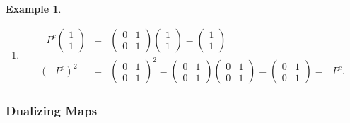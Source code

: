 \documentclass[aps,preprint]{revtex4}
\newtheorem{example}[theorem]{Example}
\begin{document}
\begin{example}
\begin{enumerate}
\begin{enumerate}
\item 
\begin{eqnarray}
\text{ }P^{c}\left( 
\begin{array}{c}
1 \\ 
1%
\end{array}%
\right) &=&\left( 
\begin{array}{cc}
0 & 1 \\ 
0 & 1%
\end{array}%
\right) \left( 
\begin{array}{c}
1 \\ 
1%
\end{array}%
\right) =\left( 
\begin{array}{c}
1 \\ 
1%
\end{array}%
\right) \\
\left( \text{ }P^{c}\right) ^{2} &=&\left( 
\begin{array}{cc}
0 & 1 \\ 
0 & 1%
\end{array}%
\right) ^{2}=\left( 
\begin{array}{cc}
0 & 1 \\ 
0 & 1%
\end{array}%
\right) \left( 
\begin{array}{cc}
0 & 1 \\ 
0 & 1%
\end{array}%
\right) =\left( 
\begin{array}{cc}
0 & 1 \\ 
0 & 1%
\end{array}%
\right) =\text{ }P^{c}.
\end{eqnarray}
\end{enumerate}
\end{enumerate}
\end{example}

\subsubsection{Dualizing Maps}
\end{document}
